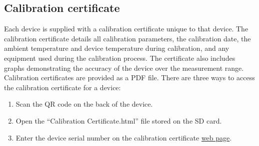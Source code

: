 \subsection{Calibration certificate}

Each device is supplied with a calibration certificate unique to that device.  The calibration certificate details all calibration parameters, the calibration date, the ambient temperature and device temperature during calibration, and any equipment used during the calibration process.  The certificate also includes graphs demonstrating the accuracy of the device over the measurement range.  Calibration certificates are provided as a \ac{PDF} file.  There are three ways to access the calibration certificate for a device:

\begin{enumerate}[nolistsep]
    \item Scan the \ac{QR} code on the back of the device.
    \item Open the \enquote{Calibration Certificate.html} file stored on the \ac{SD} card.
    \item Enter the device serial number on the calibration certificate \href{https://x-io.co.uk/calibration-certificate/}{web page}.
\end{enumerate}
